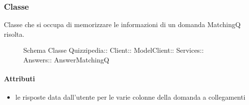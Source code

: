 \subsubsection{Classe }
Classe che si occupa di memorizzare le informazioni di un domanda MatchingQ risolta.
\begin{figure}[H]
\centering
\noindent{}
\caption[Schema Classe AnswerMatchingQ]{Schema Classe Quizzipedia:: Client:: ModelClient:: Services:: Answers:: AnswerMatchingQ}
\end{figure}
\paragraph{Attributi}
\begin{itemize}
\item {}
\newline
le risposte data dall'utente per le varie colonne della domanda a collegamenti
\end{itemize}
